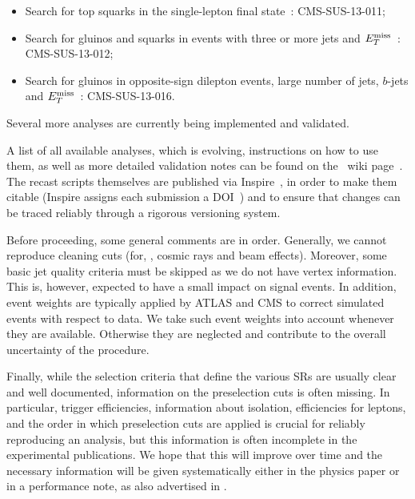 \begin{itemize}
\item Search for top squarks in the single-lepton final state~\cite{Chatrchyan:2013xna}: CMS-SUS-13-011;\\
\item Search for gluinos and squarks in events with three or more jets and $E_T^{\rm miss}$~\cite{Chatrchyan:2014lfa}: CMS-SUS-13-012;\\
\item Search for gluinos in opposite-sign dilepton events, large number of jets, $b$-jets and $E_T^{\rm miss}$~\cite{CMS:2013ija}: CMS-SUS-13-016. \\
\end{itemize}

\noindent 
Several more analyses are currently being implemented and validated.

A list of all available analyses, which is evolving, instructions on how to use them, 
as well as more detailed validation notes can be found on the \ma\ wiki page~\cite{ma5wiki}. 
The recast scripts themselves are published via {\sc Inspire}~\cite{inspire}, in order to make them citable 
({\sc Inspire} assigns each submission a DOI~\cite{doi}) and 
to ensure that changes can be traced reliably through a rigorous versioning system. 

Before proceeding, some general comments are in order. 
Generally, we cannot reproduce cleaning cuts (for, \eg, cosmic rays and beam effects). 
Moreover, some basic jet quality criteria must be skipped as we do not have vertex information. 
This is, however, expected to have a small impact on signal events. 
In addition, event weights are typically applied by ATLAS and CMS to correct simulated events with respect to data. 
We take such event weights into account whenever they are available. 
Otherwise they are neglected and contribute to the overall uncertainty of the procedure.

Finally, while the selection criteria that define the various SRs are usually clear and well documented, 
information on the preselection cuts is often missing. In particular, trigger efficiencies, information about isolation, 
efficiencies for leptons, and the order in which preselection cuts are applied is crucial for reliably reproducing an 
analysis, but this information is often incomplete in the experimental publications. 
We hope that this will improve over time and the necessary information will be given systematically 
either in the physics paper or in a performance note, 
as also advertised in \cite{Kraml:2012sg}.

